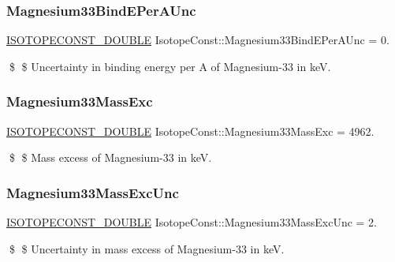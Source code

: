 \subsubsection{\texorpdfstring{Magnesium33\+Bind\+E\+Per\+A\+Unc}{Magnesium33BindEPerAUnc}}
{\footnotesize\ttfamily \mbox{\hyperlink{group___isotope_const-_macros_ga8f45a7272ce02c0b4c65c44636ed719a}{I\+S\+O\+T\+O\+P\+E\+C\+O\+N\+S\+T\+\_\+\+D\+O\+U\+B\+LE}} Isotope\+Const\+::\+Magnesium33\+Bind\+E\+Per\+A\+Unc = 0.}

\$ \$ Uncertainty in binding energy per A of Magnesium-\/33 in keV. \mbox{\label{group___isotope_const-_magnesium-_mg33_gac4967bfd4ab7505d6924caf6d533ae1f}} 
\subsubsection{\texorpdfstring{Magnesium33\+Mass\+Exc}{Magnesium33MassExc}}
{\footnotesize\ttfamily \mbox{\hyperlink{group___isotope_const-_macros_ga8f45a7272ce02c0b4c65c44636ed719a}{I\+S\+O\+T\+O\+P\+E\+C\+O\+N\+S\+T\+\_\+\+D\+O\+U\+B\+LE}} Isotope\+Const\+::\+Magnesium33\+Mass\+Exc = 4962.}

\$ \$ Mass excess of Magnesium-\/33 in keV. \mbox{\label{group___isotope_const-_magnesium-_mg33_ga589f69ed561a884abab77a78dc1fbd14}} 
\subsubsection{\texorpdfstring{Magnesium33\+Mass\+Exc\+Unc}{Magnesium33MassExcUnc}}
{\footnotesize\ttfamily \mbox{\hyperlink{group___isotope_const-_macros_ga8f45a7272ce02c0b4c65c44636ed719a}{I\+S\+O\+T\+O\+P\+E\+C\+O\+N\+S\+T\+\_\+\+D\+O\+U\+B\+LE}} Isotope\+Const\+::\+Magnesium33\+Mass\+Exc\+Unc = 2.}

\$ \$ Uncertainty in mass excess of Magnesium-\/33 in keV. \mbox{\label{group___isotope_const-_magnesium-_mg33_gac4bf61536117d2322dd758098214be0a}} 
